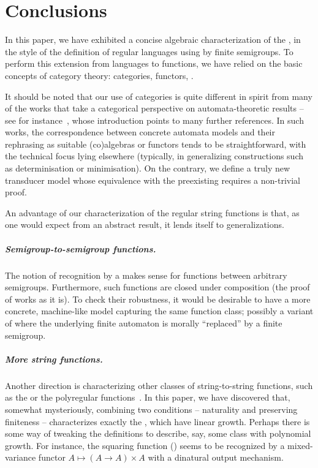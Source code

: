 \section{Conclusions}\label{sec:conclusion}

In this paper, we have exhibited a concise algebraic characterization of the
, in the style of the definition of regular
languages using  by finite semigroups. To perform this extension from
languages to functions, we have relied on the basic concepts of category theory:
categories, functors, .

It should be noted that our use of categories is quite different in spirit from
many of the works that take a categorical perspective on automata-theoretic
results -- see for instance~\cite{ColcombetPetrisan}, whose introduction points
to many further references. In such works, the correspondence between concrete
automata models and their rephrasing as suitable (co)algebras or functors tends
to be straightforward, with the technical focus lying elsewhere (typically, in
generalizing constructions such as determinisation or minimisation). On the
contrary, we define a truly new transducer model whose equivalence with the
preexisting   requires a
non-trivial proof.

An advantage of our characterization of the regular string functions is that, as
one would expect from an abstract result, it lends itself to generalizations.

\subparagraph{Semigroup-to-semigroup functions.}

The notion of recognition by a   makes
sense for functions between arbitrary semigroups. Furthermore, such functions
are closed under composition (the proof of  works as it
is). To check their robustness, it would be desirable to have a more concrete,
machine-like model capturing the same function class; possibly a variant of
 where the underlying finite automaton is morally
\enquote{replaced} by a finite semigroup.

\subparagraph{More string functions.} Another direction is
characterizing other classes of string-to-string functions, such as the  or the polyregular functions~\cite{PolyregSurvey}. In this paper, we have discovered that,
somewhat mysteriously, combining two conditions -- naturality and preserving
finiteness -- characterizes exactly the , which have linear
growth. Perhaps there is some way of tweaking the definitions to describe, say, some class with polynomial growth. For instance, the squaring function
() seems to be recognized by a mixed-variance functor
$A \mapsto (A \to A) \times A$ with a dinatural output mechanism.

